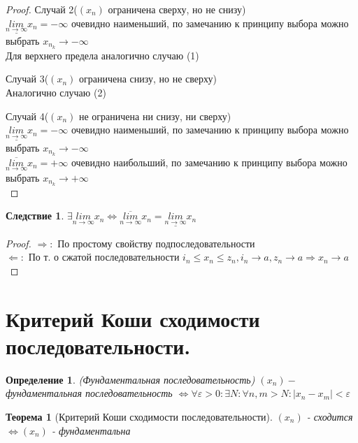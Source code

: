 \documentclass[12pt, a4]{article}
\newtheorem*{theorem}{Теорема}
\newtheorem*{corollary}{Следствие}
\newtheorem*{definition}{Определение}
\renewcommand{\lim}[2]{\underset{#1 \rightarrow #2}{lim}}
\newcommand{\limn}{\lim{n}{\infty}}
\renewcommand{\implies}{\Rightarrow}
\newcommand{\bimplies}{\Leftarrow}
\renewcommand{\iff}{\Leftrightarrow}
\renewcommand{\epsilon}{\varepsilon}
\newcommand{\limsupn}{\overline{\limn}}
\newcommand{\liminfn}{\underline{\limn}}
\begin{document}
\begin{proof}
\item{Случай 2}($(x_n)$ ограничена сверху, но не снизу)\\
$\liminfn x_n = -\infty$ очевидно наименьший, по замечанию к принципу выбора можно выбрать $x_{n_k} \to -\infty$\\
Для верхнего предела аналогично случаю (1)

\item{Случай 3}($(x_n)$ ограничена снизу, но не сверху)\\
Аналогично случаю (2)

\item{Случай 4}($(x_n)$ не ограничена ни снизу, ни сверху)\\
$\liminfn x_n = -\infty$ очевидно наименьший, по замечанию к принципу выбора можно выбрать $x_{n_k} \to -\infty$\\
$\limsupn x_n = +\infty$ очевидно наибольший, по замечанию к принципу выбора можно выбрать $x_{n_k} \to +\infty$\\
\end{proof}

\begin{corollary}
$\exists \limn x_n \iff \limsupn x_n = \liminfn x_n$
\end{corollary}

\begin{proof} $\implies:$ По простому свойству подпоследовательности\\
$\bimplies:$ По т. о сжатой последовательности $i_n \leq x_n \leq z_n, i_n \to a, z_n \to a \implies x_n \to a$
\end{proof}

\section{Критерий Коши сходимости последовательности.}

\begin{definition}(Фундаментальная последовательность)
$(x_n) - $ фундаментальная последовательность $\iff \forall \epsilon > 0: \exists N: \forall n, m > N: |x_n - x_m| < \epsilon$
\end{definition}

\begin{theorem}[Критерий Коши сходимости последовательности]
$(x_n)$ - сходится $\iff (x_n)$ - фундаментальна
\end{theorem}
\end{document}
